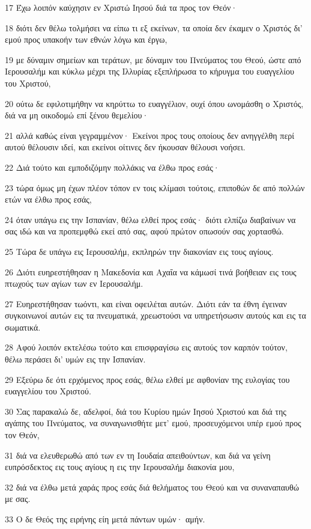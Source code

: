 \par 17 Έχω λοιπόν καύχησιν εν Χριστώ Ιησού διά τα προς τον Θεόν·
\par 18 διότι δεν θέλω τολμήσει να είπω τι εξ εκείνων, τα οποία δεν έκαμεν ο Χριστός δι' εμού προς υπακοήν των εθνών λόγω και έργω,
\par 19 με δύναμιν σημείων και τεράτων, με δύναμιν του Πνεύματος του Θεού, ώστε από Ιερουσαλήμ και κύκλω μέχρι της Ιλλυρίας εξεπλήρωσα το κήρυγμα του ευαγγελίου του Χριστού,
\par 20 ούτω δε εφιλοτιμήθην να κηρύττω το ευαγγέλιον, ουχί όπου ωνομάσθη ο Χριστός, διά να μη οικοδομώ επί ξένου θεμελίου·
\par 21 αλλά καθώς είναι γεγραμμένον· Εκείνοι προς τους οποίους δεν ανηγγέλθη περί αυτού θέλουσιν ιδεί, και εκείνοι οίτινες δεν ήκουσαν θέλουσι νοήσει.
\par 22 Διά τούτο και εμποδιζόμην πολλάκις να έλθω προς εσάς·
\par 23 τώρα όμως μη έχων πλέον τόπον εν τοις κλίμασι τούτοις, επιποθών δε από πολλών ετών να έλθω προς εσάς,
\par 24 όταν υπάγω εις την Ισπανίαν, θέλω ελθεί προς εσάς· διότι ελπίζω διαβαίνων να σας ιδώ και να προπεμφθώ εκεί από σας, αφού πρώτον οπωσούν σας χορτασθώ.
\par 25 Τώρα δε υπάγω εις Ιερουσαλήμ, εκπληρών την διακονίαν εις τους αγίους.
\par 26 Διότι ευηρεστήθησαν η Μακεδονία και Αχαΐα να κάμωσί τινά βοήθειαν εις τους πτωχούς των αγίων των εν Ιερουσαλήμ.
\par 27 Ευηρεστήθησαν τωόντι, και είναι οφειλέται αυτών. Διότι εάν τα έθνη έγειναν συγκοινωνοί αυτών εις τα πνευματικά, χρεωστούσι να υπηρετήσωσιν αυτούς και εις τα σωματικά.
\par 28 Αφού λοιπόν εκτελέσω τούτο και επισφραγίσω εις αυτούς τον καρπόν τούτον, θέλω περάσει δι' υμών εις την Ισπανίαν.
\par 29 Εξεύρω δε ότι ερχόμενος προς εσάς, θέλω ελθεί με αφθονίαν της ευλογίας του ευαγγελίου του Χριστού.
\par 30 Σας παρακαλώ δε, αδελφοί, διά του Κυρίου ημών Ιησού Χριστού και διά της αγάπης του Πνεύματος, να συναγωνισθήτε μετ' εμού, προσευχόμενοι υπέρ εμού προς τον Θεόν,
\par 31 διά να ελευθερωθώ από των εν τη Ιουδαία απειθούντων, και διά να γείνη ευπρόσδεκτος εις τους αγίους η εις την Ιερουσαλήμ διακονία μου,
\par 32 διά να έλθω μετά χαράς προς εσάς διά θελήματος του Θεού και να συναναπαυθώ με σας.
\par 33 Ο δε Θεός της ειρήνης είη μετά πάντων υμών· αμήν.

